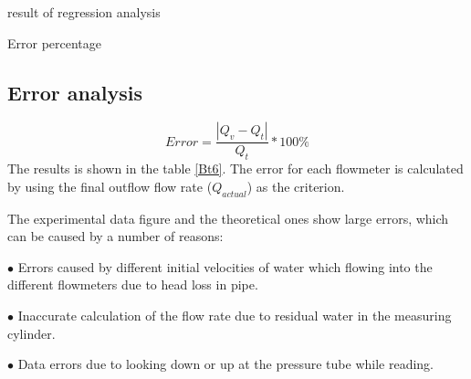 \begin{minipage}[h]{\textwidth}
  \begin{minipage}[h]{0.49\textwidth}
    \makeatletter{}
    \centering
    \caption{result of regression analysis}
    \label{Bt5} 
  \end{minipage}
  \begin{minipage}{0.49\textwidth}
    \makeatletter{}
    \centering
    \caption{Error percentage}
    \label{Bt6}
  \end{minipage}  
\end{minipage}


\subsection{Error analysis}
\begin{equation}
    Error=\frac{|Q_v-Q_t|}{Q_t}*100\%
    \label{Be9}
\end{equation}
The results is shown in the table \ref{Bt6}.
The error for each flowmeter is calculated 
by using the final outflow flow rate ($Q_{actual}$) as the criterion.

The experimental data figure and the theoretical ones show large errors, 
which can be caused by a number of reasons:

$\bullet$ Errors caused by different initial velocities of 
water which flowing into the different flowmeters due to head loss in pipe.


$\bullet$ Inaccurate calculation of the flow rate due to residual 
water in the measuring cylinder.

$\bullet$ Data errors due to looking down or up at the pressure tube while reading.